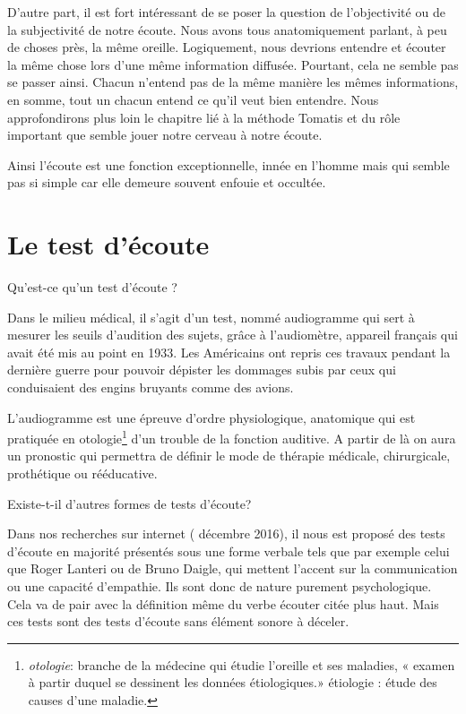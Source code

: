 D'autre part, il est fort intéressant de se poser la question de
l'objectivité ou de la subjectivité de notre écoute. Nous avons tous
anatomiquement parlant, à peu de choses près, la même
oreille. Logiquement, nous devrions entendre et écouter la même chose
lors d'une même information diffusée. Pourtant, cela ne semble pas se
passer ainsi. Chacun n'entend pas de la même manière les mêmes
informations, en somme, tout un chacun entend ce qu'il veut bien
entendre. Nous approfondirons plus loin le chapitre lié à la méthode
Tomatis et du rôle important que semble jouer notre cerveau à notre
écoute.

Ainsi l'écoute est une fonction exceptionnelle, innée en l'homme mais
qui semble pas si simple car elle demeure souvent enfouie et occultée.

\section{Le test d'écoute} %

Qu'est-ce qu'un test d'écoute ?

Dans le milieu médical, il s'agit d'un test, nommé audiogramme qui
sert à mesurer les seuils d'audition des sujets, grâce à l'audiomètre,
appareil français qui avait été mis au point en 1933. Les Américains
ont repris ces travaux pendant la dernière guerre pour pouvoir dépister
les dommages subis par ceux qui conduisaient des engins bruyants comme
des avions.

L'audiogramme est une épreuve d'ordre physiologique, anatomique qui
est pratiquée en otologie\footnote{\emph{otologie}: branche de la médecine
  qui étudie l'oreille et ses maladies, « examen à partir duquel se
  dessinent les données étiologiques.» étiologie : étude des causes
  d'une maladie.}  d'un trouble de la fonction auditive. A partir de
là on aura un pronostic qui permettra de définir le mode de thérapie
médicale, chirurgicale, prothétique ou rééducative.


Existe-t-il d'autres formes de tests d'écoute?

Dans nos recherches sur internet ( décembre 2016), il nous est
proposé des tests d'écoute en majorité présentés sous une forme verbale
tels que par exemple celui que Roger Lanteri ou de Bruno Daigle, qui
mettent l'accent sur la communication ou une capacité d'empathie. Ils
sont donc de nature purement psychologique. Cela va de pair avec la
définition même du verbe écouter citée plus haut. Mais ces tests sont
des tests d'écoute sans élément sonore à déceler.


